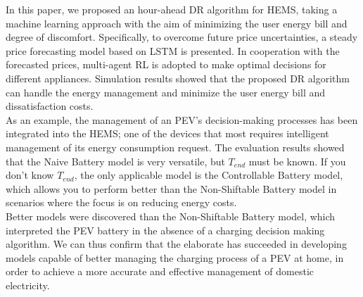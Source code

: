 In this paper, we proposed an hour-ahead DR algorithm for HEMS, taking a machine learning approach with the aim of minimizing the user energy bill and degree of discomfort. Specifically, to overcome future price uncertainties, a steady price forecasting model based on LSTM is presented. In cooperation with the forecasted prices, multi-agent RL is adopted to make optimal decisions for different appliances. Simulation results showed that the proposed DR algorithm can handle the energy management and minimize the user energy bill and dissatisfaction costs.\\
As an example, the management of an PEV's decision-making processes has been integrated into the HEMS; one of the devices that most requires intelligent management of its energy consumption request. The evaluation results showed that the Naive Battery model is very versatile, but $T_{end}$ must be known. If you don't know $T_{end}$, the only applicable model is the Controllable Battery model, which allows you to perform better than the Non-Shiftable Battery model in scenarios where the focus is on reducing energy costs. \\
Better models were discovered than the Non-Shiftable Battery model, which interpreted the PEV battery in the absence of a charging decision making algorithm. We can thus confirm that the elaborate has succeeded in developing models capable of better managing the charging process of a PEV at home, in order to achieve a more accurate and effective management of domestic electricity.\\
